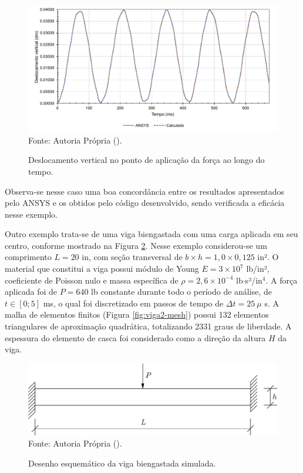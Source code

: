 \begin{figure}[h!]
    \centering
    \caption{Deslocamento vertical no ponto de aplicação da força ao longo do tempo.}
    \includegraphics[width=\linewidth]{Figuras/vigas/res1.pdf}
    \\Fonte: Autoria Própria (\the\year).
    \label{fig:res-viga1}
\end{figure}

Observa-se nesse caso uma boa concordância entre os resultados apresentados pelo ANSYS e os obtidos pelo código desenvolvido, sendo verificada a eficácia nesse exemplo.

Outro exemplo trata-se de uma viga biengastada com uma carga aplicada em seu centro, conforme mostrado na Figura \ref{fig:viga2}. Nesse exemplo considerou-se um comprimento $L=20$ in, com seção transversal de $b\times h=1,0\times0,125$ in². O material que constitui a viga possui módulo de Young $E=3\times10^{7}$ lb/in², coeficiente de Poisson nulo e massa específica de $\rho=2,6\times10^{-4}$ lb$\cdot$s²/in$^4$. A força aplicada foi de $P=640$ lb constante durante todo o período de análise, de $t\in[0;5]$ ms, o qual foi discretizado em passos de tempo de $\Delta t=25\ \mu$ s. A malha de elementos finitos (Figura \ref{fig:viga2-mesh}) possui 132 elementos triangulares de aproximação quadrática, totalizando 2331 graus de liberdade. A espessura do elemento de casca foi considerado como a direção da altura $H$ da viga.

\begin{figure}[h!]
    \centering
    \caption{Desenho esquemático da viga biengastada simulada.}
    \includegraphics[width=0.6\linewidth]{Figuras/vigas/viga2.pdf}
    \\Fonte: Autoria Própria (\the\year).
    \label{fig:viga2}
\end{figure}

